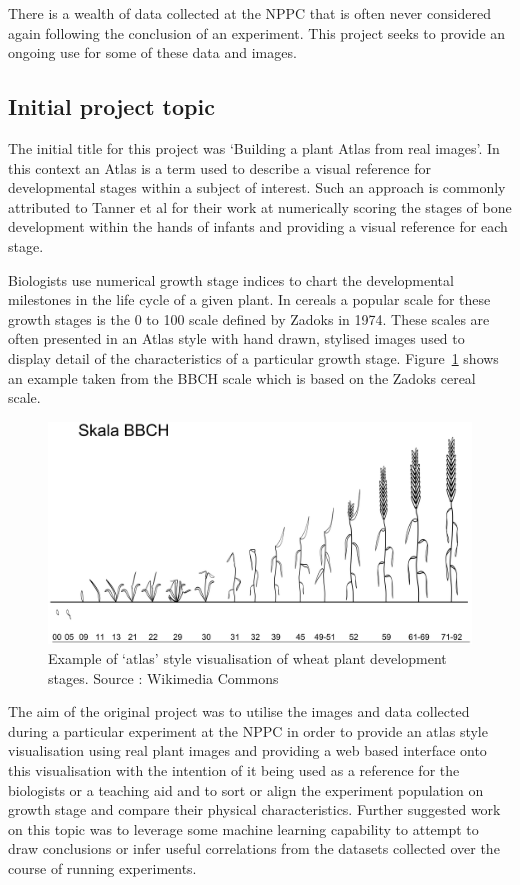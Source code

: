 There is a wealth of data collected at the NPPC that is often never considered again following the conclusion of an experiment. This project seeks to provide an ongoing use for some of these data and images.

\subsection{Initial project topic}
The initial title for this project was `Building a plant Atlas from real images'.  In this context an Atlas is a term used to describe a visual reference for developmental stages within a subject of interest. Such an approach is commonly attributed to Tanner et al \cite{tanner_assessment_1975} for their work at numerically scoring the stages of bone development within the hands of infants and providing a visual reference for each stage. 

Biologists use numerical growth stage indices to chart the developmental milestones in the life cycle of a given plant. In cereals a popular scale for these growth stages is the 0 to 100 scale defined by Zadoks \cite{zadoks_decimal_1974} in 1974. These scales are often presented in an Atlas style with hand drawn, stylised images used to display detail of the characteristics of a particular growth stage. Figure~\ref{fig:bbch} shows an example taken from the BBCH scale which is based on the Zadoks cereal scale.

\begin{figure}[H]
    \centering
    \includegraphics[width=\textwidth]{images/background/bbchscale}
    \caption{Example of `atlas' style visualisation of wheat plant development stages. Source : Wikimedia Commons \cite{bbch_scale}}
    \label{fig:bbch}
\end{figure}



 The aim of the original project was to utilise the images and data collected during a particular experiment at the NPPC in order to provide an atlas style visualisation using real plant images and providing a web based interface onto this visualisation with the intention of it being used as a reference for the biologists or a teaching aid and to sort or align the experiment population on growth stage and compare their physical characteristics. Further suggested work on this topic was to leverage some machine learning capability to attempt to draw conclusions or infer useful correlations from the datasets collected over the course of running experiments.

